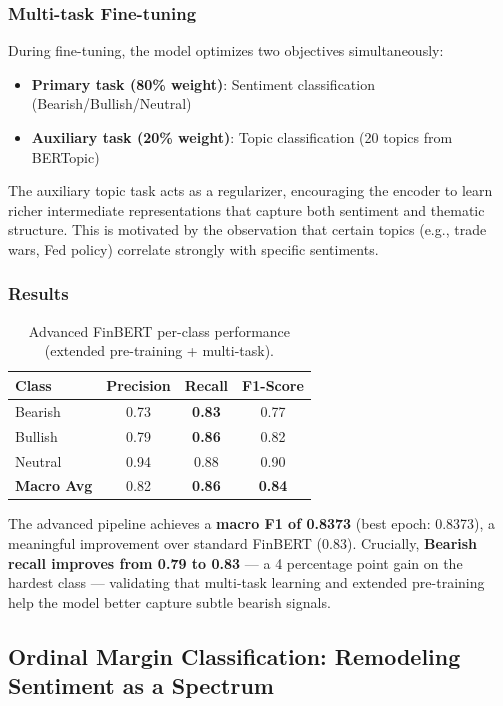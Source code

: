 \documentclass[11pt,a4paper]{article}
\begin{document}
\subsubsection{Multi-task Fine-tuning}
During fine-tuning, the model optimizes two objectives simultaneously:
\begin{itemize}[noitemsep]
    \item \textbf{Primary task (80\% weight)}: Sentiment classification (Bearish/Bullish/Neutral)
    \item \textbf{Auxiliary task (20\% weight)}: Topic classification (20 topics from BERTopic)
\end{itemize}

The auxiliary topic task acts as a regularizer, encouraging the encoder to learn richer intermediate representations that capture both sentiment and thematic structure. This is motivated by the observation that certain topics (e.g., trade wars, Fed policy) correlate strongly with specific sentiments.

\subsubsection{Results}

\begin{table}[H]
\centering
\caption{Advanced FinBERT per-class performance (extended pre-training + multi-task).}
\label{tab:advanced_finbert}
\begin{tabular}{lccc}
\toprule
\textbf{Class} & \textbf{Precision} & \textbf{Recall} & \textbf{F1-Score} \\
\midrule
Bearish & 0.73 & \textbf{0.83} & 0.77 \\
Bullish & 0.79 & \textbf{0.86} & 0.82 \\
Neutral & 0.94 & 0.88 & 0.90 \\
\midrule
\textbf{Macro Avg} & 0.82 & \textbf{0.86} & \textbf{0.84} \\
\bottomrule
\end{tabular}
\end{table}

The advanced pipeline achieves a \textbf{macro F1 of 0.8373} (best epoch: 0.8373), a meaningful improvement over standard FinBERT (0.83). Crucially, \textbf{Bearish recall improves from 0.79 to 0.83} --- a 4 percentage point gain on the hardest class --- validating that multi-task learning and extended pre-training help the model better capture subtle bearish signals.

\subsection{Ordinal Margin Classification: Remodeling Sentiment as a Spectrum}
\end{document}
